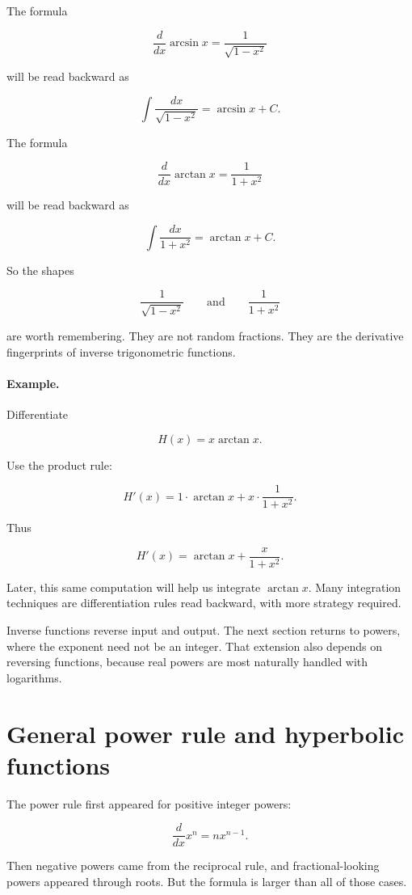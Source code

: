 The formula

\[
\frac{d}{dx}\arcsin x=\frac1{\sqrt{1-x^2}}
\]

will be read backward as

\[
\int \frac{dx}{\sqrt{1-x^2}}=\arcsin x+C.
\]

The formula

\[
\frac{d}{dx}\arctan x=\frac1{1+x^2}
\]

will be read backward as

\[
\int \frac{dx}{1+x^2}=\arctan x+C.
\]

So the shapes

\[
\frac1{\sqrt{1-x^2}}
\qquad\text{and}\qquad
\frac1{1+x^2}
\]

are worth remembering.  They are not random fractions.  They are the derivative fingerprints of inverse trigonometric functions.

\paragraph{Example.}
Differentiate

\[
H(x)=x\arctan x.
\]

Use the product rule:

\[
H'(x)=1\cdot\arctan x+x\cdot\frac1{1+x^2}.
\]

Thus

\[
\boxed{
H'(x)=\arctan x+\frac{x}{1+x^2}.
}
\]

Later, this same computation will help us integrate \(\arctan x\).  Many integration techniques are differentiation rules read backward, with more strategy required.

Inverse functions reverse input and output.  The next section returns to powers, where the exponent need not be an integer.  That extension also depends on reversing functions, because real powers are most naturally handled with logarithms.

\section{General power rule and hyperbolic functions}
\label{sec:general-power-rule-hyperbolic-functions}

The power rule first appeared for positive integer powers:

\[
\frac{d}{dx}x^n=nx^{n-1}.
\]

Then negative powers came from the reciprocal rule, and fractional-looking powers appeared through roots.  But the formula is larger than all of those cases.


